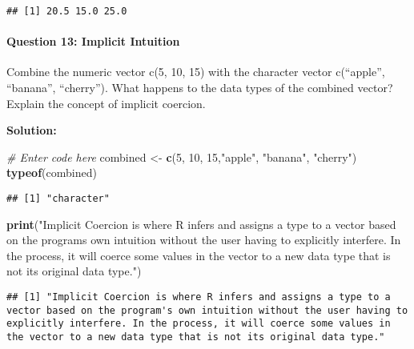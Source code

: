 \documentclass[
]{article}
\newenvironment{Shaded}{\begin{snugshade}}{\end{snugshade}}
\newcommand{\CommentTok}[1]{\textcolor[rgb]{0.56,0.35,0.01}{\textit{#1}}}
\newcommand{\DecValTok}[1]{\textcolor[rgb]{0.00,0.00,0.81}{#1}}
\newcommand{\FunctionTok}[1]{\textcolor[rgb]{0.13,0.29,0.53}{\textbf{#1}}}
\newcommand{\NormalTok}[1]{#1}
\newcommand{\OtherTok}[1]{\textcolor[rgb]{0.56,0.35,0.01}{#1}}
\newcommand{\StringTok}[1]{\textcolor[rgb]{0.31,0.60,0.02}{#1}}
\begin{document}
\begin{verbatim}
## [1] 20.5 15.0 25.0
\end{verbatim}

\hypertarget{question-13-implicit-intuition}{%
\paragraph{Question 13: Implicit
Intuition}\label{question-13-implicit-intuition}}

Combine the numeric vector c(5, 10, 15) with the character vector
c(``apple'', ``banana'', ``cherry''). What happens to the data types of
the combined vector? Explain the concept of implicit coercion.

\textbf{Solution:}

\begin{Shaded}
\begin{Highlighting}[]
\CommentTok{\# Enter code here}
\NormalTok{combined }\OtherTok{\textless{}{-}} \FunctionTok{c}\NormalTok{(}\DecValTok{5}\NormalTok{, }\DecValTok{10}\NormalTok{, }\DecValTok{15}\NormalTok{,}\StringTok{"apple"}\NormalTok{, }\StringTok{"banana"}\NormalTok{, }\StringTok{"cherry"}\NormalTok{)}
\FunctionTok{typeof}\NormalTok{(combined)}
\end{Highlighting}
\end{Shaded}

\begin{verbatim}
## [1] "character"
\end{verbatim}

\begin{Shaded}
\begin{Highlighting}[]
\FunctionTok{print}\NormalTok{(}\StringTok{"Implicit Coercion is where R infers and assigns a type to a vector based on the program\textquotesingle{}s own intuition without the user having to explicitly interfere. In the process, it will coerce some values in the vector to a new data type that is not its original data type."}\NormalTok{)}
\end{Highlighting}
\end{Shaded}

\begin{verbatim}
## [1] "Implicit Coercion is where R infers and assigns a type to a vector based on the program's own intuition without the user having to explicitly interfere. In the process, it will coerce some values in the vector to a new data type that is not its original data type."
\end{verbatim}
\end{document}

